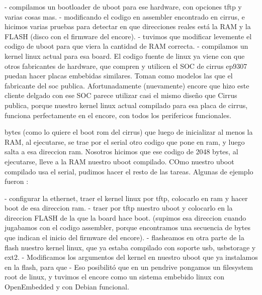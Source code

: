 \documentclass[conference]{IEEEtran}
\begin{document}
- compilamos un bootloader de uboot para ese hardware, con opciones tftp y varias cosas mas.
- modificando el codigo en assembler encontrado en cirrus, e hicimos varias pruebas para detectar
  en que direcciones reales está la RAM y la FLASH (disco con el firmware del encore).
- tuvimos que modificar levemente el codigo de uboot para que viera la cantidad de RAM correcta.
- compilamos un kernel linux actual para esa board. El codigo fuente de linux ya viene con 
  que otros fabricantes de hardware, que compren y utilicen el SOC de cirrus ep9307
  puedan hacer placas embebidas similares. Toman como modelos las que el fabricante
  del soc publica.
  Afortunadamente (nuevamente) encore que hizo este cliente delgado con ese SOC
  parece utilizar casi el mismo diseño que Cirrus publica, porque nuestro kernel linux
  actual compilado para esa placa de cirrus, funciona perfectamente en el encore,
  con todos los perifericos funcionales.

  bytes (como lo quiere el boot rom del cirrus) que luego de inicializar al menos la RAM, al ejecutarse,
  se trae por el serial otro codigo que pone en ram, y luego salta a esa direccion ram.
  Nosotros hicimos que ese codigo de 2048 bytes, al ejecutarse, lleve a la RAM nuestro
  uboot compilado. COmo nuestro uboot compilado usa el serial, pudimos hacer el resto
  de las tareas. Algunas de ejemplo fueron :

  - configurar la ethernet, traer el kernel linux por tftp, colocarlo en ram y hacer boot de esa direccion ram.
  - traer por tftp nuestro uboot y colocarlo en la direccion FLASH de la que la board hace boot.
    (supimos esa direccion cuando jugabamos con el codigo assembler, porque encontramos una secuencia de bytes que indican
    el inicio del firmware del encore).
  - flasheamos en otra parte de la flash nuestro kernel linux, que ya estaba compilado con soporte usb, usbstorage y ext2.
  - Modificamos los argumentos del kernel en nuestro uboot que ya instalamos en la flash, para que 
  - Eso posibilitó que en un pendrive pongamos un filesystem root de linux, y tuvimos el encore
    como un sistema embebido linux con OpenEmbedded y con Debian funcional.
\end{document}
